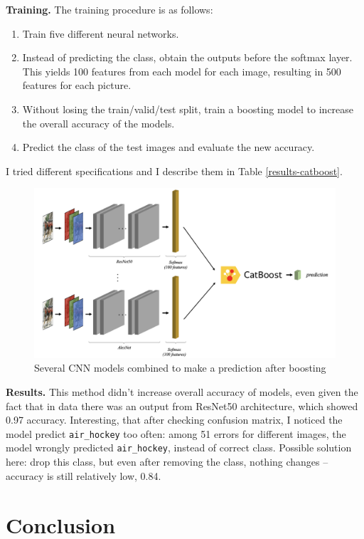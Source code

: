 \documentclass[reqno]{article}
\begin{document}
\textbf{Training.} The training procedure is as follows:
\begin{enumerate}
	\item Train five different neural networks.
	\item Instead of predicting the class, obtain the outputs before the softmax layer. This yields 100 features from each model for each image, resulting in 500 features for each picture.
	\item Without losing the train/valid/test split, train a boosting model to increase the overall accuracy of the models.
	\item Predict the class of the test images and evaluate the new accuracy.
\end{enumerate}

I tried different specifications and I describe them in Table \ref{results-catboost}.

	\begin{figure}[ht]
	\centering
	\includegraphics[width=0.8\linewidth]{Catboost}
	\caption{Several CNN models combined to make a prediction after boosting}
	\label{boosting}
\end{figure}

\textbf{Results.} This method didn't increase overall accuracy of models, even given the fact that in data there was an output from ResNet50 architecture, which showed 0.97 accuracy. Interesting, that after checking confusion matrix, I noticed the model predict \texttt{air\_hockey}  too often: among 51 errors for different images, the model wrongly predicted \texttt{air\_hockey}, instead of correct class. Possible solution here: drop this class, but even after removing the class, nothing changes -- accuracy is still relatively low, 0.84.

\section{Conclusion}
\end{document}
